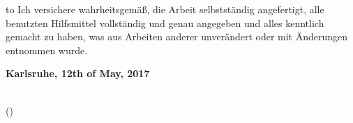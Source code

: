 
\thispagestyle{empty}
\null\vfill
\noindent\hbox to \textwidth{\hrulefill} 
%
{Ich versichere wahrheitsgemäß, die Arbeit
selbstständig angefertigt, alle benutzten Hilfsmittel vollständig und genau
angegeben und alles kenntlich gemacht zu haben, was aus Arbeiten anderer
unverändert oder mit Änderungen entnommen wurde.}
 
 
\textbf{Karlsruhe, 12th of May, 2017}
\vspace{1.5cm}
 
\dotfill\hspace*{8.0cm}\\
\hspace*{2cm}(\theauthor) 
\cleardoublepage